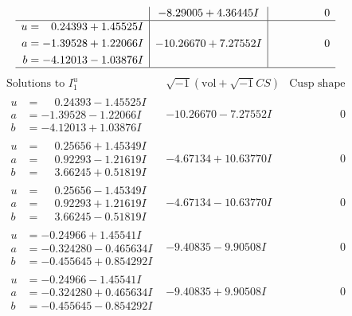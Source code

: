 \documentclass[1p]{elsarticle_modified}
\theoremstyle{definition}
\newcommand{\I}{\sqrt{-1}}
\begin{document}
$$\begin{array}{c|c|c}
 & -8.29005 + 4.36445 I & \phantom{-0.000000 } 0 \\ \hline\begin{aligned}
u &= \phantom{-}0.24393 + 1.45525 I \\
a &= -1.39528 + 1.22066 I \\
b &= -4.12013 - 1.03876 I\end{aligned}
 & -10.26670 + 7.27552 I & \phantom{-0.000000 } 0\\
 \hline 
 \end{array}$$\newpage$$\begin{array}{c|c|c}  
\text{Solutions to }I^u_{1}& \I (\text{vol} + \sqrt{-1}CS) & \text{Cusp shape}\\
 \hline 
\begin{aligned}
u &= \phantom{-}0.24393 - 1.45525 I \\
a &= -1.39528 - 1.22066 I \\
b &= -4.12013 + 1.03876 I\end{aligned}
 & -10.26670 - 7.27552 I & \phantom{-0.000000 } 0 \\ \hline\begin{aligned}
u &= \phantom{-}0.25656 + 1.45349 I \\
a &= \phantom{-}0.92293 - 1.21619 I \\
b &= \phantom{-}3.66245 + 0.51819 I\end{aligned}
 & -4.67134 + 10.63770 I & \phantom{-0.000000 } 0 \\ \hline\begin{aligned}
u &= \phantom{-}0.25656 - 1.45349 I \\
a &= \phantom{-}0.92293 + 1.21619 I \\
b &= \phantom{-}3.66245 - 0.51819 I\end{aligned}
 & -4.67134 - 10.63770 I & \phantom{-0.000000 } 0 \\ \hline\begin{aligned}
u &= -0.24966 + 1.45541 I \\
a &= -0.324280 - 0.465634 I \\
b &= -0.455645 + 0.854292 I\end{aligned}
 & -9.40835 - 9.90508 I & \phantom{-0.000000 } 0 \\ \hline\begin{aligned}
u &= -0.24966 - 1.45541 I \\
a &= -0.324280 + 0.465634 I \\
b &= -0.455645 - 0.854292 I\end{aligned}
 & -9.40835 + 9.90508 I & \phantom{-0.000000 } 0 \\ \hline\begin{aligned}

\end{aligned}
\end{array}$$
\end{document}
